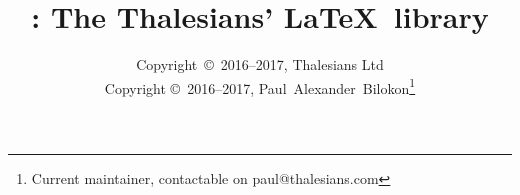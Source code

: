 

\documentclass[10pt]{article}

\usepackage[usecolour=true, useimakeidx=true]{lathalesians-commons}
\usepackage[usegeometry=true]{lathalesians-formatting}
\usepackage{lathalesians-font}
\usepackage{lathalesians-code}
\usepackage{lathalesians-analysis}
\usepackage{lathalesians-linear}
\usepackage{lathalesians-probability}
\usepackage{lathalesians-categories}
\usepackage{lathalesians-theorems}
\usepackage{lathalesians-domains}
\usepackage{lathalesians-computability}

\usepackage{longtable}
\usepackage{nomencl}
\usepackage{url}

\title{\LaThalesians: The Thalesians' \LaTeX~library}
\author{Copyright~\copyright~2016--2017, Thalesians Ltd \\
Copyright \copyright~2016--2017, Paul~Alexander~Bilokon\footnote{Current maintainer, contactable on \textsf{paul@thalesians.com}}}

\makeindex[name=general, title=Subject index]
\makeindex[name=authors, title=Index of authors]

\makenomenclature



\maketitle

\tableofcontents

\section{Overview}

The \LaThalesians library comprises a heterogeneous collection of \LaTeX~packages, which facilitate the typesetting of the Thalesians' work in mathematics, computer science, and finance. It was originally developed by Paul~Bilokon to support his academic and professional work and the library's scope still reflects some of his personal biases, \viz:
\begin{itemize}
\item mathematical finance,
\item econometrics,
\item programming,
\item scientific computing,
\item algorithms,
\item statistics,
\item stochastic analysis,
\item probability theory,
\item domain theory,
\item computability theory.
\end{itemize}

